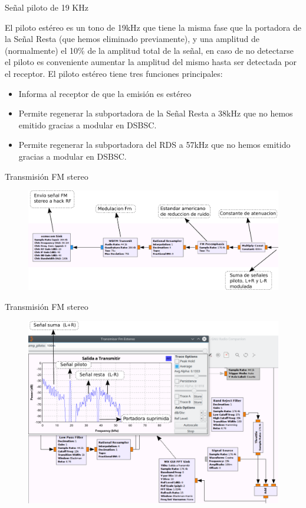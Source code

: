 \begin{frame}{Señal piloto de 19 KHz}

 El piloto estéreo es un tono de 19kHz que tiene la misma fase que la portadora de la Señal Resta (que hemos eliminado previamente), y una amplitud de (normalmente) el 10\% de la amplitud total de la señal, en caso de no detectarse el piloto es conveniente aumentar la amplitud del mismo hasta ser detectada por el receptor.
El piloto estéreo tiene tres funciones principales:

\begin{itemize}
    \item {Informa al receptor de que la emisión es estéreo}
    \item{Permite regenerar la subportadora de la Señal Resta a 38kHz que no hemos emitido gracias a modular en DSBSC.}
    \item{Permite regenerar la subportadora del RDS a 57kHz que no hemos emitido gracias a modular en DSBSC.}
\end{itemize}
    
\end{frame}

\begin{frame}{Transmisión FM stereo}

\begin{figure}[H]
\centering
\vspace{-3mm}
\includegraphics[width=\textwidth]{parte3/lab12/pdf/lab12_4.pdf}
\end{figure}
    
\end{frame}

\begin{frame}{Transmisión FM stereo}

\begin{figure}[H]
\centering
\vspace{-3mm}
\includegraphics[width=.9\textwidth]{parte3/lab12/pdf/lab12_5.pdf}
\end{figure}
    
\end{frame}

